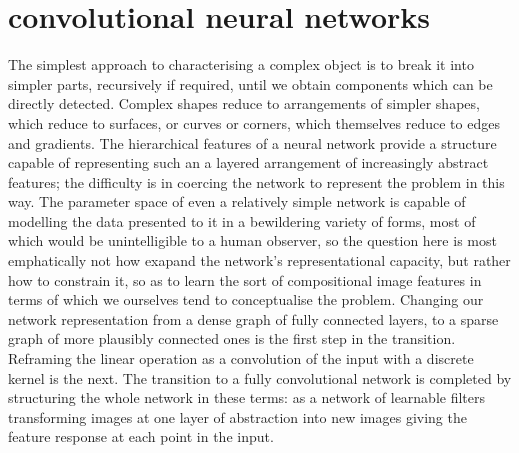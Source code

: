 \documentclass[msc]{infthesis}
\begin{document}
\section{convolutional neural networks}
\label{sec:segmentation:convolution}


The simplest approach to characterising a complex object is to break it into simpler parts,
recursively if required, until we obtain components which can be directly detected.   Complex
shapes reduce to arrangements of simpler shapes, which reduce to surfaces, or curves or corners,
which themselves reduce to edges and gradients.  The hierarchical features of a neural network
provide a structure capable of representing such an a layered arrangement of increasingly
abstract features; the difficulty is in coercing the network to represent the problem in this
way.  The parameter space of even a relatively simple network is capable of modelling the data
presented to it in a bewildering variety of forms, most of which would be unintelligible to a
human observer, so the question here is most emphatically not how exapand the network's
representational capacity, but rather how to constrain it, so as to learn the sort of compositional
image features in terms of which we ourselves tend to conceptualise the problem.  Changing our
network representation from a dense graph of fully connected layers, to a sparse graph of more
plausibly connected ones is the first step in the transition.  Reframing the linear operation
as a convolution of the input with a discrete kernel is the next.  The transition to a fully
convolutional network is completed by structuring the whole network in these terms: as a network
of learnable filters transforming images at one layer of abstraction into new images giving the
feature response at each point in the input.

\end{document}
